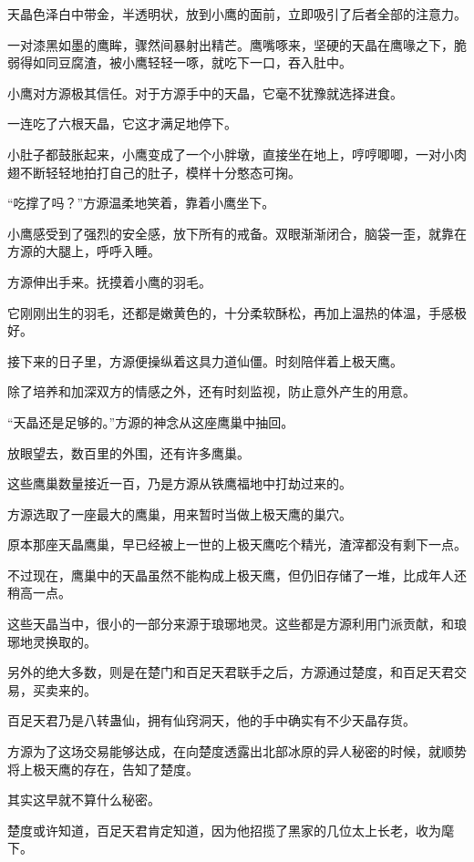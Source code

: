 \begin{this_body}
天晶色泽白中带金，半透明状，放到小鹰的面前，立即吸引了后者全部的注意力。

一对漆黑如墨的鹰眸，骤然间暴射出精芒。鹰嘴啄来，坚硬的天晶在鹰喙之下，脆弱得如同豆腐渣，被小鹰轻轻一啄，就吃下一口，吞入肚中。

小鹰对方源极其信任。对于方源手中的天晶，它毫不犹豫就选择进食。

一连吃了六根天晶，它这才满足地停下。

小肚子都鼓胀起来，小鹰变成了一个小胖墩，直接坐在地上，哼哼唧唧，一对小肉翅不断轻轻地拍打自己的肚子，模样十分憨态可掬。

“吃撑了吗？”方源温柔地笑着，靠着小鹰坐下。

小鹰感受到了强烈的安全感，放下所有的戒备。双眼渐渐闭合，脑袋一歪，就靠在方源的大腿上，呼呼入睡。

方源伸出手来。抚摸着小鹰的羽毛。

它刚刚出生的羽毛，还都是嫩黄色的，十分柔软酥松，再加上温热的体温，手感极好。

接下来的日子里，方源便操纵着这具力道仙僵。时刻陪伴着上极天鹰。

除了培养和加深双方的情感之外，还有时刻监视，防止意外产生的用意。

“天晶还是足够的。”方源的神念从这座鹰巢中抽回。

放眼望去，数百里的外围，还有许多鹰巢。

这些鹰巢数量接近一百，乃是方源从铁鹰福地中打劫过来的。

方源选取了一座最大的鹰巢，用来暂时当做上极天鹰的巢穴。

原本那座天晶鹰巢，早已经被上一世的上极天鹰吃个精光，渣滓都没有剩下一点。

不过现在，鹰巢中的天晶虽然不能构成上极天鹰，但仍旧存储了一堆，比成年人还稍高一点。

这些天晶当中，很小的一部分来源于琅琊地灵。这些都是方源利用门派贡献，和琅琊地灵换取的。

另外的绝大多数，则是在楚门和百足天君联手之后，方源通过楚度，和百足天君交易，买卖来的。

百足天君乃是八转蛊仙，拥有仙窍洞天，他的手中确实有不少天晶存货。

方源为了这场交易能够达成，在向楚度透露出北部冰原的异人秘密的时候，就顺势将上极天鹰的存在，告知了楚度。

其实这早就不算什么秘密。

楚度或许知道，百足天君肯定知道，因为他招揽了黑家的几位太上长老，收为麾下。


\end{this_body}
